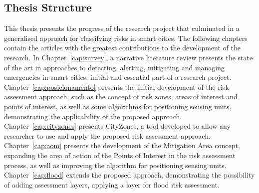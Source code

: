 \begin{refsection}
\section{Thesis Structure}\label{sec:estrutura}


This thesis presents the progress of the research project that culminated in a generalised approach for classifying risks in smart cities. The following chapters contain the articles with the greatest contributions to the development of the research. In Chapter~\ref{cap:survey}, a narrative literature review presents the state of the art in approaches to detecting, alerting, mitigating and managing emergencies in smart cities, initial and essential part of a research project. Chapter~\ref{cap:posicionamento} presents the initial development of the risk assessment approach, such as the concept of risk zones, areas of interest and points of interest, as well as some algorithms for positioning sensing units, demonstrating the applicability of the proposed approach. Chapter~\ref{cap:cityzones} presents CityZones, a tool developed to allow any researcher to use and apply the proposed risk assessment approach. Chapter~\ref{cap:aom} presents the development of the Mitigation Area concept, expanding the area of action of the Points of Interest in the risk assessment process, as well as improving the algorithm for positioning sensing units. Chapter~\ref{cap:flood} extends the proposed approach, demonstrating the possibility of adding assessment layers, applying a layer for flood risk assessment.

\printbibliography[heading=subbibliography]

\end{refsection}
